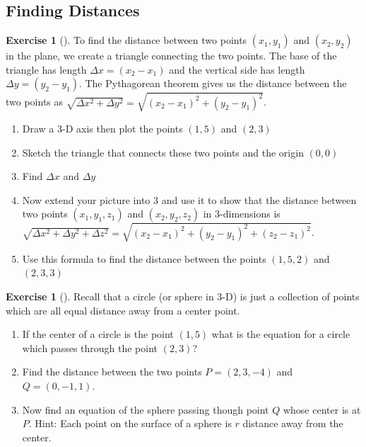 \documentclass[10pt,]{book}
\theoremstyle{plain}
\theoremstyle{definition}
\theoremstyle{definition}
\theoremstyle{definition}
\theoremstyle{definition}
\newtheorem{exploration}[project]{Exercise}
\theoremstyle{definition}
\numberwithin{equation}{section}
\begin{document}
\subsection[{Finding Distances}]{Finding Distances}\label{subsection-4}
\begin{exploration}[]\label{exploration-19}
To find the distance between two points \((x_1,y_1)\) and \((x_2,y_2)\) in the plane, we create a triangle connecting the two points. The base of the triangle has length \(\Delta x=(x_2-x_1)\) and the vertical side has length \(\Delta y=(y_2-y_1)\). The Pythagorean theorem gives us the distance between the two points as \(\sqrt{\Delta x^2+\Delta y^2}=\sqrt{(x_2-x_1)^2+(y_2-y_1)^2}\).%
\begin{enumerate}[font=\bfseries,label=(\alph*),ref=\alph*]
\item\label{task-25} Draw a 3-D axis then plot the points \((1,5)\) and \((2,3)\)%
\item\label{task-26} Sketch the triangle that connects these two points and the origin \textemdash{} \((0,0)\)%
\item\label{task-27} Find \(\Delta x\) and \(\Delta y\)%
\item\label{task-28} Now extend your picture into 3 and use it to show that the distance between two points \((x_1,y_1,z_1)\) and \((x_2,y_2,z_2)\) in 3-dimensions is \(\sqrt{\Delta x^2+\Delta y^2+\Delta z^2}=\sqrt{(x_2-x_1)^2+(y_2-y_1)^2+(z_2-z_1)^2}\).%
\item\label{task-29} Use this formula to find the distance between the points \((1,5,2)\) and \((2,3,3)\)%
\end{enumerate}
\end{exploration}
\begin{exploration}[]\label{exploration-20}
Recall that a circle (or sphere in 3-D) is just a collection of points which are all equal distance away from a center point.%
\begin{enumerate}[font=\bfseries,label=(\alph*),ref=\alph*]
\item\label{task-30} If the center of a circle is the point \((1,5)\) what is the equation for a circle which passes through the point \((2,3)\)?%
\item\label{task-31} Find the distance between the two points \(P=(2,3,-4)\) and \(Q=(0,-1,1)\).%
\item\label{task-32} Now find an equation of the sphere passing though point \(Q\) whose center is at \(P\). Hint: Each point on the surface of a sphere is \(r\) distance away from the center.%
\end{enumerate}
\end{exploration}
\end{document}
